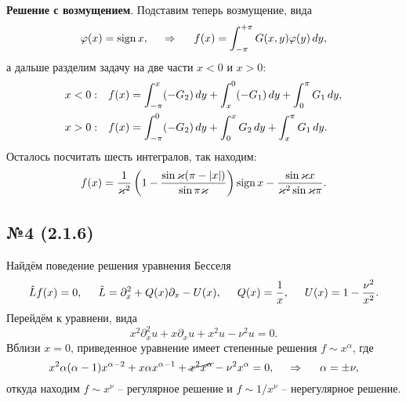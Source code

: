 \textbf{Решение с возмущением}. Подставим теперь возмущение, вида 
\begin{equation*}
    \varphi(x)  = \mathop{\mathrm{sign}}\nolimits x,
    \hspace{0.5cm} \Rightarrow \hspace{0.5cm}
    f(x) = 
    \int_{-\pi}^{+\pi} G(x, y) \varphi(y) \, d y,
\end{equation*}
а дальше разделим задачу на две части $x<0$ и $x > 0$:
\begin{align*}
    &x<0:
    &f(x) &= \int_{-\pi}^{x} (-G_2) \, d y  + \int_{x}^{0} (-G_1) \, d y + \int_{0}^{\pi} G_1 \, d y, \\
    &x >0:
    &f(x) &= \int_{-\pi}^{0} (-G_2) \, d y + \int_{0}^{x}  G_2 \, d y + \int_{x}^{\pi} G_1 \, d y.
\end{align*}
Осталось посчитать шесть интегралов, так находим:
\begin{equation*}
    f(x) = \frac{1}{\varkappa^2} \left(
         1 - \frac{\sin \varkappa (\pi - |x|) }{\sin  \pi \varkappa}
    \right) \mathop{\mathrm{sign}}\nolimits x - 
    \frac{\sin \varkappa x}{\varkappa^2 \sin \varkappa \pi}.
\end{equation*}



\subsection*{№4 (2.1.6)}




Найдём поведение решения уравнения Бесселя
\begin{equation*}
    \hat{L} f(x) = 0,
    \hspace{5 mm} 
    \hat{L} = \partial_x^2 + Q(x) \partial_x - U(x),
    \hspace{5 mm} 
    Q(x) = \frac{1}{x}, 
    \hspace{5 mm} U(x) = 1 - \frac{\nu^2}{x^2}.
\end{equation*}
Перейдём к уравнени, вида
\begin{equation*}
    x^2 \partial_x^2 u + x \partial_x u + x^2 u - \nu^2 u = 0.
\end{equation*}
Вблизи $x = 0$, приведенное уравнение имеет степенные решения $f \sim x^{\alpha}$, где 
\begin{equation*}
    x^2 \alpha (\alpha-1) x^{\alpha-2} + x \alpha x^{\alpha-1} + \cancel{x^2 x^{\alpha}} - \nu^2 x^{\alpha} = 0,
    \hspace{0.5cm} \Rightarrow \hspace{0.5cm}
    \alpha = \pm \nu,
\end{equation*}
откуда находим $f \sim x^\nu$ -- регулярное решение и $f \sim 1/x^{\nu}$ -- нерегулярное решение. 


